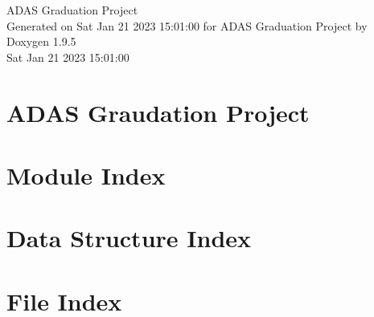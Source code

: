\documentclass[twoside]{book}
\newcommand{\+}{\discretionary{\mbox{\scriptsize$\hookleftarrow$}}{}{}}
\newcommand{\clearemptydoublepage}{%
    \newpage{\pagestyle{empty}\cleardoublepage}%
  }
\begin{document}
  \raggedbottom
    \hypersetup{pageanchor=false,
                bookmarksnumbered=true,
                pdfencoding=unicode
               }
  \begin{titlepage}
  \vspace*{7cm}
  \begin{center}%
  {\Large ADAS Graduation Project}\\
  \vspace*{1cm}
  {\large Generated on Sat Jan 21 2023 15\+:01\+:00 for ADAS Graduation Project by Doxygen 1.9.5}\\
    \vspace*{0.5cm}
    {\small Sat Jan 21 2023 15:01:00}
  \end{center}
  \end{titlepage}
  \clearemptydoublepage
  \tableofcontents
  \clearemptydoublepage
  \hypersetup{pageanchor=true}
\chapter{ADAS Graudation Project}
\label{index}\hypertarget{index}{}
\chapter{Module Index}

\chapter{Data Structure Index}

\chapter{File Index}

\end{document}
